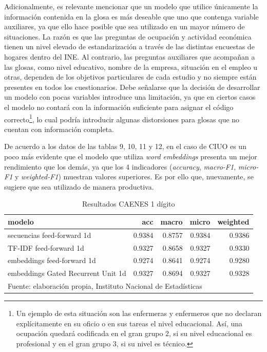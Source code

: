 \documentclass[
  12pt,
  spanish,
]{article}
\begin{document}
Adicionalmente, es relevante mencionar que un modelo que utilice
únicamente la información contenida en la glosa es más deseable que uno
que contenga variable auxiliares, ya que ello hace posible que sea
utilizado en un mayor número de situaciones. La razón es que las
preguntas de ocupación y actividad económica tienen un nivel elevado de
estandarización a través de las distintas encuestas de hogares dentro
del INE. Al contrario, las preguntas auxiliares que acompañan a las
glosas, como nivel educativo, nombre de la empresa, situación en el
empleo u otras, dependen de los objetivos particulares de cada estudio y
no siempre están presentes en todos los cuestionarios. Debe señalarse
que la decisión de desarrollar un modelo con pocas variables introduce
una limitación, ya que en ciertos casos el modelo no contará con la
información suficiente para asignar el código correcto\footnote{Un
  ejemplo de esta situación son las enfermeras y enfermeros que no
  declaran explícitamente en su oficio o en sus tareas el nivel
  educacional. Así, una ocupación quedará codificada en el gran grupo 2,
  si su nivel educacional es profesional y en el gran grupo 3, si su
  nivel es técnico.}, lo cual podría introducir algunas distorsiones
para glosas que no cuentan con información completa.

De acuerdo a los datos de las tablas 9, 10, 11 y 12, en el caso de CIUO
es un poco más evidente que el modelo que utiliza \emph{word embeddings}
presenta un mejor rendimiento que los demás, ya que los 4 indicadores
(\emph{accuracy}, \emph{macro-F1}, \emph{micro-F1} y \emph{weighted-F1})
muestran valores superiores. Es por ello que, nuevamente, se sugiere que
sea utilizado de manera productiva.

\begin{table}[H]

\caption{\label{tab:resultados_entrenamiento}Resultados CAENES 1 dígito}
\centering
\fontsize{9.5}{11.5}\selectfont
\begin{tabular}[t]{lrrrr}
\toprule
modelo & acc & macro & micro & weighted\\
\midrule
secuencias feed-forward 1d & 0.9384 & 0.8757 & 0.9384 & 0.9386\\
TF-IDF feed-forward 1d & 0.9327 & 0.8658 & 0.9327 & 0.9330\\
embeddings feed-forward 1d & 0.9274 & 0.8641 & 0.9274 & 0.9280\\
embeddings Gated Recurrent Unit 1d & 0.9327 & 0.8694 & 0.9327 & 0.9328\\
\bottomrule
\multicolumn{5}{l}{\rule{0pt}{1em}Fuente: elaboración propia, Instituto Nacional de Estadísticas }\\
\end{tabular}
\end{table}
\end{document}
